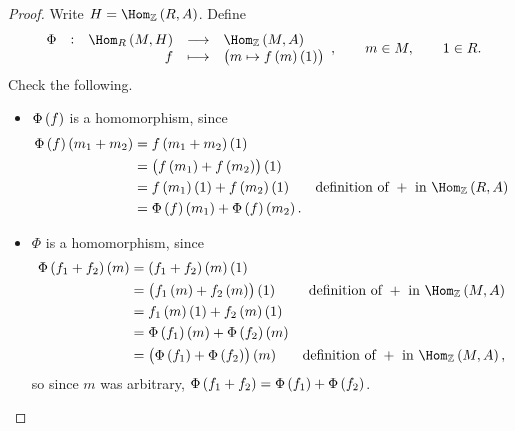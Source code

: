 \begin{proof}
Write $ H = \Hom_\ZZ\br{R, A} $. Define
$$ \function[\Phi]{\Hom_R\br{M, H}}{\Hom_\ZZ\br{M, A}}{f}{\br{m \mapsto f\br{m}\br{1}}}, \qquad m \in M, \qquad 1 \in R. $$
Check the following.
\begin{itemize}
\item $ \Phi\br{f} $ is a homomorphism, since
\begin{align*}
\Phi\br{f}\br{m_1 + m_2}
& = f\br{m_1 + m_2}\br{1} \\
& = \br{f\br{m_1} + f\br{m_2}}\br{1} \\
& = f\br{m_1}\br{1} + f\br{m_2}\br{1} & \text{definition of} \ + \ \text{in} \ \Hom_\ZZ\br{R, A} \\
& = \Phi\br{f}\br{m_1} + \Phi\br{f}\br{m_2}.
\end{align*}
\item $ \Phi $ is a homomorphism, since
\begin{align*}
\Phi\br{f_1 + f_2}\br{m}
& = \br{f_1 + f_2}\br{m}\br{1} \\
& = \br{f_1\br{m} + f_2\br{m}}\br{1} & \text{definition of} \ + \ \text{in} \ \Hom_\ZZ\br{M, A} \\
& = f_1\br{m}\br{1} + f_2\br{m}\br{1} \\
& = \Phi\br{f_1}\br{m} + \Phi\br{f_2}\br{m} \\
& = \br{\Phi\br{f_1} + \Phi\br{f_2}}\br{m} & \text{definition of} \ + \ \text{in} \ \Hom_\ZZ\br{M, A},
\end{align*}
so since $ m $ was arbitrary, $ \Phi\br{f_1 + f_2} = \Phi\br{f_1} + \Phi\br{f_2} $.
\end{itemize}

\pagebreak


\end{proof}
